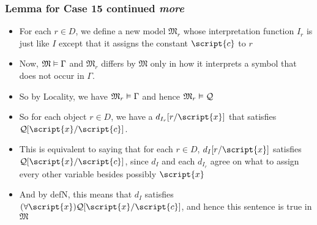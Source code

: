\begin{frame}
\frametitle{Lemma for Case 15 continued \textit{more}}

\begin{itemize}[<+->]

\item For each $r \in D$, we define a new model $\mathfrak{M}_r$ whose interpretation function $I_r$ is just like $I$ except that it assigns the constant $\script{c}$ to $r$ 

\item Now, $\mathfrak{M} \vDash \Gamma$ and $\mathfrak{M}_r$ differs by $\mathfrak{M}$ only in how it interprets a symbol that does not occur in $\Gamma$. 

\item So by Locality, we have $\mathfrak{M}_r \vDash \Gamma$ and hence $\mathfrak{M}_r \vDash \mathcal{Q}$

\item So for each object $r \in D$, we have a $d_{I_r} [r/\script{x}]$ that satisfies $\metav{Q}\substitute{\script{c}}{\script{x}}$. 


\item This is equivalent to saying that for each $r \in D$, $d_I [r/\script{x}]$ satisfies $\metav{Q}\substitute{\script{c}}{\script{x}}$, since $d_I$ and each $d_{I_r}$ agree on what to assign every other variable besides possibly $\script{x}$

\item And by defN, this means that $d_I$ satisfies $\qt{\forall}{\script{x}}\metav{Q}\substitute{\script{c}}{\script{x}}$, and hence this sentence is true in $\mathfrak{M}$











\end{itemize}
\end{frame}








